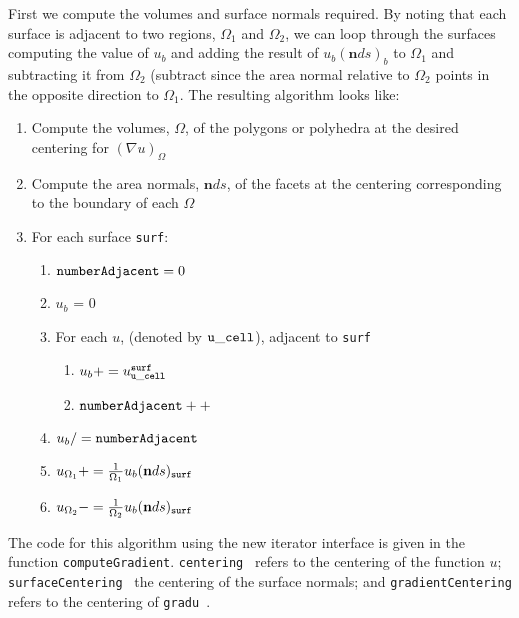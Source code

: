  First we compute the volumes and surface normals
required.  By noting that each surface is adjacent to two regions, $\Omega_1$
and $\Omega_2$, we can loop through the surfaces computing the value of
$u_b$ and adding the result of $u_b(\mathbf{n}ds)_b$ to $\Omega_1$ and
subtracting it from $\Omega_2$ (subtract since the area normal relative
to $\Omega_2$ points in the opposite direction to $\Omega_1$. The
resulting algorithm looks like:
\begin{enumerate}
  \item Compute the volumes, $\Omega$, of the polygons or polyhedra at the desired centering for $(\nabla u)_\Omega $
  \item Compute the area normals, $\mathbf{n}ds$, of the facets at the centering corresponding to the boundary of each $\Omega$
  \item For each surface {\tt surf}:
    \begin{enumerate}
      \item ${\tt numberAdjacent}=0$
      \item $u_b$ = 0
      \item For each $u$, (denoted by ${\tt u\_cell }$), adjacent to {\tt surf}
	\begin{enumerate}
	  \item $u_b += u_{\tt u\_cell}^{\tt surf}$
	  \item ${\tt numberAdjacent}++$
	\end{enumerate}
      \item $u_b /= {\tt numberAdjacent}$
      \item $u_{\Omega_1} += \frac{1}{\Omega_1} u_b (\mathbf{n}ds)_{\tt surf}$
      \item $u_{\Omega_2} -= \frac{1}{\Omega_2} u_b (\mathbf{n}ds)_{\tt surf}$
    \end{enumerate}
\end{enumerate}
 
The code for this algorithm using the new \umap iterator interface is given in the function
{\tt computeGradient}.  {\tt centering } refers to the centering of the function $u$; {\tt 
surfaceCentering } the centering of the surface normals; and {\tt gradientCentering} refers
to the centering of {\tt gradu }.
\newpage

